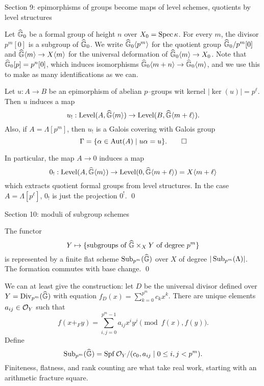Section 9: epimorphisms of groups become maps of level schemes, quotients by level structures

Let $\widehat{\mathbb G}_0$ be a formal group of height $n$ over $X_0 = \operatorname{Spec} \kappa$.  For every $m$, the divisor $p^m[0]$ is a subgroup of $\widehat{\mathbb G}_0$.  We write $\widehat{\mathbb G}_0\langle p^m\rangle$ for the quotient group $\widehat{\mathbb G}_0 / p^m[0]$ and $\widehat{\mathbb G}\langle m\rangle \to X\langle m\rangle$ for the universal deformation of $\widehat{\mathbb G}_0\langle m\rangle \to X_0$.  Note that $\widehat{\mathbb G}_0[p] = p^n[0]$, which induces isomorphisms $\widehat{\mathbb G}_0\langle m+n\rangle \to \widehat{\mathbb G}_0\langle m\rangle$, and we use this to make as many identifications as we can.

\begin{lemma}
Let $u: A \to B$ be an epimorphism of abelian $p$--groups wit kernel $|\ker(u)| = p^\ell$.  Then $u$ induces a map \[u_!: \operatorname{Level}(A, \widehat{\mathbb G}\langle m\rangle) \to \operatorname{Level}(B, \widehat{\mathbb G}\langle m+\ell\rangle).\]  Also, if $A = \Lambda[p^m]$, then $u_!$ is a Galois covering with Galois group \[\Gamma = \{\alpha \in \operatorname{Aut}(A) \mid u\alpha = u\}. \qed\]
\end{lemma}

\begin{corollary}
In particular, the map $A \to 0$ induces a map \[0_!: \operatorname{Level}(A, \widehat{\mathbb G}\langle m\rangle) \to \operatorname{Level}(0, \widehat{\mathbb G}\langle m+\ell\rangle) = X\langle m+\ell\rangle\] which extracts quotient formal groups from level structures.  In the case $A = \Lambda[p^\ell]$, $0_!$ is just the projection $0^!$. \qed
\end{corollary}

Section 10: moduli of subgroup schemes

\begin{theorem}
The functor \[Y \mapsto \{\text{subgroups of $\widehat{\mathbb G} \times_X Y$ of degree $p^m$}\}\] is represented by a finite flat scheme $\operatorname{Sub}_{p^m}(\widehat{\mathbb G})$ over $X$ of degree $|\operatorname{Sub}_{p^m}(\Lambda)|$.  The formation commutes with base change. \qed
\end{theorem}

We can at least give the construction: let $D$ be the universal divisor defined over $Y = \operatorname{Div}_{p^m}(\widehat{\mathbb G})$ with equation $f_D(x) = \sum_{k=0}^{p^m} c_k x^k$.  There are unique elements $a_{ij} \in \mathcal{O}_Y$ such that \[f(x +_F y) = \sum_{i,j=0}^{p^m-1} a_{ij} x^i y^j \pmod{f(x), f(y)}.\]  Define \[\operatorname{Sub}_{p^m}(\widehat{\mathbb G}) = \operatorname{Spf} \mathcal{O}_Y / (c_0, a_{ij} \mid 0 \le i, j < p^m).\]  Finiteness, flatness, and rank counting are what take real work, starting with an arithmetic fracture square.

